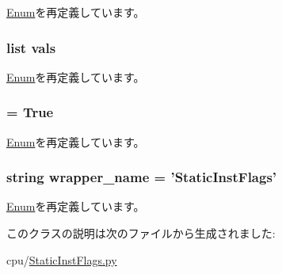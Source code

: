 \hyperlink{classm5_1_1params_1_1Enum_a8c2dc4d96bdbbac20face743a1c0f909}{Enum}を再定義しています。\hypertarget{classStaticInstFlags_1_1StaticInstFlags_ac8dfdb1d5e96e93836fb573bc3cd2110}{
\subsubsection[{vals}]{\setlength{\rightskip}{0pt plus 5cm}list {\bf vals}}}
\label{classStaticInstFlags_1_1StaticInstFlags_ac8dfdb1d5e96e93836fb573bc3cd2110}


\hyperlink{classm5_1_1params_1_1Enum_ac8dfdb1d5e96e93836fb573bc3cd2110}{Enum}を再定義しています。\hypertarget{classStaticInstFlags_1_1StaticInstFlags_a774c4f5a238e6bd6cc19b2ad18ec0f4f}{
\subsubsection[{wrapper\_\-is\_\-struct}]{ = True}}
\label{classStaticInstFlags_1_1StaticInstFlags_a774c4f5a238e6bd6cc19b2ad18ec0f4f}


\hyperlink{classm5_1_1params_1_1Enum_a774c4f5a238e6bd6cc19b2ad18ec0f4f}{Enum}を再定義しています。\hypertarget{classStaticInstFlags_1_1StaticInstFlags_a8d8e670fd263dbfded71859e88b6ac8b}{
\subsubsection[{wrapper\_\-name}]{\setlength{\rightskip}{0pt plus 5cm}string {\bf wrapper\_\-name} = '{\bf StaticInstFlags}'}}
\label{classStaticInstFlags_1_1StaticInstFlags_a8d8e670fd263dbfded71859e88b6ac8b}


\hyperlink{classm5_1_1params_1_1Enum_a8d8e670fd263dbfded71859e88b6ac8b}{Enum}を再定義しています。

このクラスの説明は次のファイルから生成されました:\begin{DoxyCompactItemize}
\item 
cpu/\hyperlink{StaticInstFlags_8py}{StaticInstFlags.py}\end{DoxyCompactItemize}
